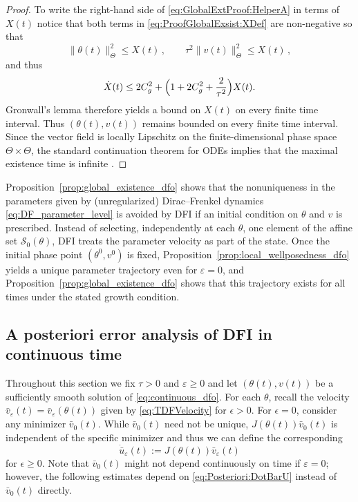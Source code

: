 \documentclass[oneside,11pt]{article}
\theoremstyle{remark}
\theoremstyle{thmstyleone}
\theoremstyle{thmstylethree}
\theoremstyle{thmstyletwo}
\newcommand{\mcS}{\mathcal{S}}
\begin{document}
\begin{proof}
            To write the right-hand side of \eqref{eq:GlobalExtProof:HelperA} in terms of $X(t)$ notice that both terms in \eqref{eq:ProofGlobalExsist:XDef} are non-negative so that
            \[
            \|\theta(t)\|_{\Theta}^2 \leq X(t)\,,\qquad \tau^2 \|v(t)\|_{\Theta}^2 \leq X(t)\,,
            \]
            and thus
            \begin{equation*}
             \dot{X}(t) \leq
            2C_g^2+\Bigl(1+2C_g^2+\frac{2}{\tau^2}\Bigr)X(t).
          \end{equation*}
          Gronwall's lemma therefore yields a bound on $X(t)$ on every finite time interval. Thus $(\theta(t),v(t))$ remains bounded on every finite time interval. Since the vector field is locally Lipschitz on the finite-dimensional phase space $\Theta\times\Theta$, the standard continuation theorem for ODEs implies that the maximal existence time is infinite \cite[Theorem~2.17]{TeschlODE}. 
        \end{proof}


    Proposition~\ref{prop:global_existence_dfo} shows that the nonuniqueness in the parameters given by (unregularized) Dirac--Frenkel dynamics \eqref{eq:DF_parameter_level} is avoided by DFI if an initial condition on $\theta$ and $v$ is prescribed.
        Instead of selecting, independently at each $\theta$, one element of the affine set $\mcS_0(\theta)$, DFI treats the parameter velocity as part of the state.
        Once the initial phase point $(\theta^0,v^0)$ is fixed, Proposition~\ref{prop:local_wellposedness_dfo} yields a unique parameter trajectory even for $\varepsilon=0$, and Proposition~\ref{prop:global_existence_dfo} shows that this trajectory exists for all times under the stated growth condition.



\subsection{A posteriori error analysis of DFI in continuous time}
\label{sec:continuous_error_analysis}


 Throughout this section we fix $\tau>0$ and $\varepsilon \geq 0$ and let $(\theta(t),v(t))$ be a sufficiently smooth solution of \eqref{eq:continuous_dfo}. For each $\theta$, recall the velocity $\bar{v}_{\varepsilon}(t) = \bar{v}_{\varepsilon}(\theta(t))$ given by \eqref{eq:TDFVelocity} for $\epsilon > 0$. For $\epsilon = 0$, consider any minimizer $\bar{v}_0(t)$. While $\bar{v}_0(t)$ need not be unique, $J(\theta(t))\bar{v}_0(t)$ is independent of the specific minimizer and thus we can define the corresponding 
\begin{equation}\label{eq:Posteriori:DotBarU}
\dot{\bar u}_\varepsilon(t):=J(\theta(t))\bar v_\varepsilon(t) 
\end{equation}
for $\epsilon \geq 0$. Note that $\bar{v}_0(t)$ might not depend continuously on time if $\varepsilon=0$; however, the following estimates depend on \eqref{eq:Posteriori:DotBarU} instead of $\bar{v}_0(t)$ directly. 
\end{document}

